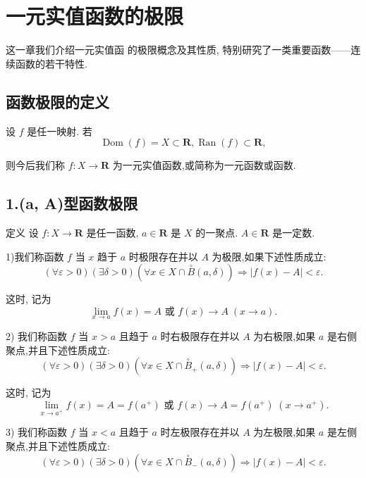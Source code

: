 \chapter{一元实值函数的极限}

这一章我们介绍一元实值函 的极限概念及其性质, 特别研究了一类重要函数——连续函数的若干特性.

\section{函数极限的定义}

设 $f$ 是任一映射. 若
$$\operatorname{Dom}\left( f\right)  = X \subset  \mathbf{R},\operatorname{Ran}\left( f\right)  \subset  \mathbf{R},$$

则今后我们称 $f : X \rightarrow  \mathbf{R}$ 为一元实值函数,或简称为一元函数或函数.

\section*{1.(a, A)型函数极限}

定义 设 $f : X \rightarrow  \mathbf{R}$ 是任一函数, $a \in  \mathbf{R}$ 是 $X$ 的一聚点. $A \in  \mathbf{R}$ 是一定数.

1)我们称函数 $f$ 当 $x$ 趋于 $a$ 时极限存在并以 $A$ 为极限,如果下述性质成立:
$$\left( {\forall \varepsilon  > 0}\right) \left( {\exists \delta  > 0}\right) \left( {\forall x \in  X \cap  \overset{ \circ  }{B}\left( {a,\delta }\right) }\right)  \Rightarrow  \left| {f\left( x\right)  - A}\right|  < \varepsilon .$$

这时, 记为
$$\mathop{\lim }\limits_{{x \rightarrow  a}}f\left( x\right)  = A\text{ 或 }f\left( x\right)  \rightarrow  A\;\left( {x \rightarrow  a}\right) .$$

2) 我们称函数 $f$ 当 $x > a$ 且趋于 $a$ 时右极限存在并以 $A$ 为右极限,如果 $a$ 是右侧聚点,并且下述性质成立:
$$\left( {\forall \varepsilon  > 0}\right) \left( {\exists \delta  > 0}\right) \left( {\forall x \in  X \cap  {\overset{ \circ  }{B}}_{ + }\left( {a,\delta }\right) }\right)  \Rightarrow  \left| {f\left( x\right)  - A}\right|  < \varepsilon .$$

这时, 记为
$$\mathop{\lim }\limits_{{x \rightarrow  {a}^{ + }}}f\left( x\right)  = A = f\left( {a}^{ + }\right) \text{ 或 }f\left( x\right)  \rightarrow  A = f\left( {a}^{ + }\right) \;\left( {x \rightarrow  {a}^{ + }}\right) .$$

3) 我们称函数 $f$ 当 $x < a$ 且趋于 $a$ 时左极限存在并以 $A$ 为左极限,如果 $a$ 是左侧聚点,并且下述性质成立:
$$\left( {\forall \varepsilon  > 0}\right) \left( {\exists \delta  > 0}\right) \left( {\forall x \in  X \cap  {\overset{ \circ  }{B}}_{ - }\left( {a,\delta }\right) }\right)  \Rightarrow  \left| {f\left( x\right)  - A}\right|  < \varepsilon .$$

